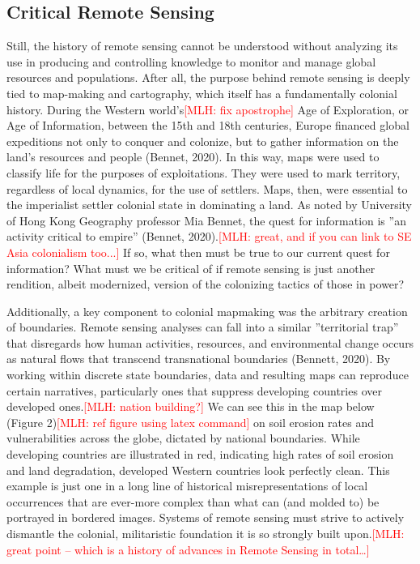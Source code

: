 \documentclass{book}\usepackage{knitr}
\newcommand{\red}[1]{\textcolor{red}{[MLH: #1]}}
\begin{document}
\subsection{Critical Remote Sensing}

Still, the history of remote sensing cannot be understood without analyzing its use in producing and controlling knowledge to monitor and manage global resources and populations. After all, the purpose behind remote sensing is deeply tied to map-making and cartography, which itself has a fundamentally colonial history. During the Western world’s\red{fix apostrophe} Age of Exploration, or Age of Information, between the 15th and 18th centuries, Europe financed global expeditions not only to conquer and colonize, but to gather information on the land’s resources and people (Bennet, 2020). In this way, maps were used to classify life for the purposes of exploitations. They were used to mark territory, regardless of local dynamics, for the use of settlers. Maps, then, were essential to the imperialist settler colonial state in dominating a land. As noted by University of Hong Kong Geography professor Mia Bennet, the quest for information is ''an activity critical to empire'' (Bennet, 2020).\red{great, and if you can link to SE Asia colonialism too...} If so, what then must be true to our current quest for information? What must we be critical of if remote sensing is just another rendition, albeit modernized, version of the colonizing tactics of those in power?

Additionally, a key component to colonial mapmaking was the arbitrary creation of boundaries. Remote sensing analyses can fall into a similar ''territorial trap'' that disregards how human activities, resources, and environmental change occurs as natural flows that transcend transnational boundaries (Bennett, 2020). By working within discrete state boundaries, data and resulting maps can reproduce certain narratives, particularly ones that suppress developing countries over developed ones.\red{nation building?} We can see this in the map below (Figure 2)\red{ref figure using latex command} on soil erosion rates and vulnerabilities across the globe, dictated by national boundaries. While developing countries are illustrated in red, indicating high rates of soil erosion and land degradation, developed Western countries look perfectly clean. This example is just one in a long line of historical misrepresentations of local occurrences that are ever-more complex than what can (and molded to) be portrayed in bordered images. Systems of remote sensing must strive to actively dismantle the colonial, militaristic foundation it is so strongly built upon.\red{great point -- which is a history of advances in Remote Sensing in total\ldots}
\end{document}
